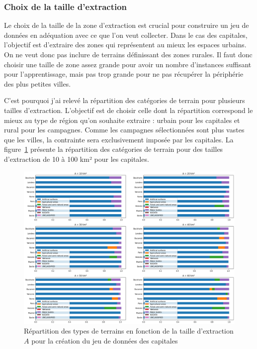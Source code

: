 \subsubsection{Choix de la taille d'extraction}

Le choix de la taille de la zone d'extraction est crucial pour construire un jeu de données en adéquation avec ce que l'on veut collecter.
Dans le cas des capitales, l'objectif est d'extraire des zones qui représentent au mieux les espaces urbains.
On ne veut donc pas inclure de terrains définissant des zones rurales.
Il faut donc choisir une taille de zone assez grande pour avoir un nombre d'instances suffisant pour l'apprentissage, mais pas trop grande pour ne pas récupérer la périphérie des plus petites villes.

C'est pourquoi j'ai relevé la répartition des catégories de terrain pour plusieurs tailles d'extraction.
L'objectif est de choisir celle dont la répartition correspond le mieux au type de région qu'on souhaite extraire : urbain pour les capitales et rural pour les campagnes.
Comme les campagnes sélectionnées sont plus vastes que les villes, la contrainte sera exclusivement imposée par les capitales.
La figure~\ref{fig:taille-extraction} présente la répartition des catégories de terrain pour des tailles d'extraction de 10 à 100 km² pour les capitales.


\begin{figure}[!h]
    \centering
    \includegraphics[width=\textwidth]{images/taille-extraction}
    \caption{Répartition des types de terrains en fonction de la taille d'extraction $A$ pour la création du jeu de données des capitales}
    \label{fig:taille-extraction}
\end{figure}




